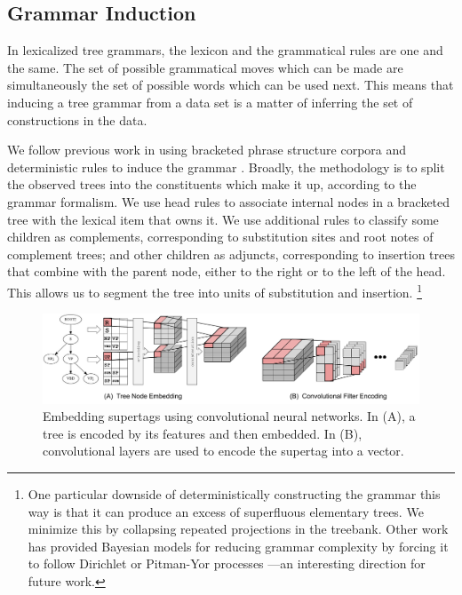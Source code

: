 \documentclass[11pt]{article}
\begin{document}
\subsection{Grammar Induction}

In lexicalized tree grammars, the lexicon and the grammatical rules
are one and the same.
%
The set of possible grammatical moves which can be made are simultaneously the set of possible words which can be used next.
%
This means that inducing a tree grammar from a data set is a matter of inferring the set of constructions in the data.


We follow previous work in using bracketed phrase structure corpora
and deterministic rules to induce the grammar
\cite{bangalore2001impact,chiang2000statistical}.
%
Broadly, the methodology is to split the observed trees into the
constituents which make it up, according to the grammar formalism.
%
We use head rules
\cite{chiang2000statistical,collins1997three,magerman1995statistical}
to associate internal nodes in a bracketed tree with the lexical item
that owns it.
%
We use additional rules to classify some children as complements,
corresponding to substitution sites and root notes of complement
trees; and other children as adjuncts, corresponding to insertion
trees that combine with the parent node, either to the right or to the
left of the head.  This allows us to segment the tree into units of
substitution and insertion.%
\footnote{One particular downside of deterministically constructing
  the grammar this way is that it can produce an excess of superfluous
  elementary trees.
%
We minimize this by collapsing repeated projections in the treebank.
%
Other work has provided Bayesian models for reducing grammar
complexity by forcing it to follow Dirichlet or Pitman-Yor processes
\cite{Cohn2010}---an interesting direction for future work.}



\begin{figure}[tH!]
\centering
\includegraphics[width=\textwidth]{spineembed.pdf}
\caption{Embedding supertags using convolutional neural networks. In (A), a tree is encoded by its features and then embedded.
 In (B), convolutional layers are used to encode the supertag into a vector.}
 \label{fig:spineembedding}
\end{figure}
\end{document}
